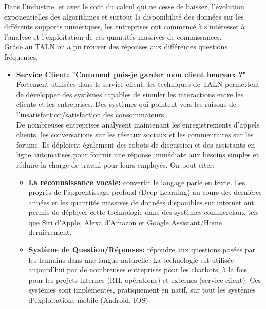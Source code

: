 \documentclass{report}
\begin{document}
Dans l'industrie, et avec le coût du calcul qui ne cesse de baisser, l'évolution exponentielles des algorithmes et surtout la disponibilité des données sur les différents supports numériques, les entreprises ont commencé à s'intéresser à l'analyse et l'exploitation de ces quantités massives de connaissances.\\
Grâce au TALN on a pu trouver des réponses aux différentes questions fréquentes. 
\begin{itemize}
    \item \textbf{Service Client: "Comment puis-je garder mon client heureux ?"}\\
    Fortement utilisées dans le service client, les techniques de TALN permettent de développer des systèmes capables de simuler les interactions entre les clients et les entreprises. Des systèmes qui pointent vers les raisons de l'insatisfaction/satisfaction des consommateurs.\\
    De nombreuses entreprises analysent maintenant les enregistrements d'appels clients, les conversations sur les réseaux sociaux et les commentaires sur les forums. Ils déploient également des robots de discussion et des assistants en ligne automatisés pour fournir une réponse immédiate aux besoins simples et réduire la charge de travail pour leurs employés. On peut citer: 
    \begin{itemize}
        \item \textbf{La reconnaissance vocale:} convertit le langage parlé en texte. Les progrès de l'apprentissage profond (Deep Learning) au cours des dernières années et les quantités massives de données disponibles sur internet ont permis de déployer cette technologie dans des systèmes commerciaux tels que Siri d'Apple, Alexa d'Amazon et Google Assistant/Home dernièrement.
        \item \textbf{Système de Question/Réponses:} répondre aux questions posées par les humains dans une langue naturelle. La technologie est utilisée aujourd'hui par de nombreuses entreprises pour les chatbots, à la fois pour les projets internes (RH, opérations) et externes (service client). Ces systèmes sont implémentés, pratiquement en natif, sur tout les systèmes d'exploitations mobile (Android, IOS).\\
    \end{itemize}


\end{itemize}
\end{document}
